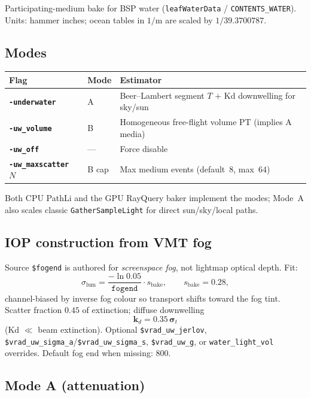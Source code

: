 \documentclass[11pt,a4paper]{article}
\newcommand{\flag}[1]{\texttt{\bfseries #1}}
\newcommand{\vmt}[1]{\texttt{\$#1}}
\newcommand{\ent}[1]{\texttt{#1}}
\newcommand{\code}[1]{\texttt{#1}}
\newcommand{\vect}[1]{\bm{#1}}
\begin{document}
Participating-medium bake for BSP water
(\code{leafWaterData} / \code{CONTENTS\_WATER}). Units: hammer inches;
ocean tables in $1/\mathrm{m}$ are scaled by $1/39.3700787$.

\subsection{Modes}

\begin{center}
\begin{tabular}{@{}lll@{}}
  \toprule
  Flag & Mode & Estimator \\
  \midrule
  \flag{-underwater} & A & Beer--Lambert segment $T$ $+$ Kd downwelling for sky/sun \\
	\flag{-uw\_volume} & B & Homogeneous free-flight volume PT (implies A media) \\
	\flag{-uw\_off} & --- & Force disable \\
	\flag{-uw\_maxscatter}~$N$ & B cap & Max medium events (default~$8$, max~$64$) \\
  \bottomrule
\end{tabular}
\end{center}

Both CPU PathLi and the GPU RayQuery baker implement the modes; Mode~A also
scales classic \code{GatherSampleLight} for direct sun/sky/local paths.

\subsection{IOP construction from VMT fog}

Source \vmt{fogend} is authored for \emph{screenspace fog}, not lightmap
optical depth. Fit:
\begin{equation}
  \sigma_{\mathrm{lum}}
  =
  \frac{-\ln 0.05}{\texttt{fogend}}
  \cdot s_{\mathrm{bake}},
  \qquad
  s_{\mathrm{bake}}=0.28,
\end{equation}
channel-biased by inverse fog colour so transport shifts toward the fog tint.
Scatter fraction $0.45$ of extinction; diffuse downwelling
\begin{equation}
  \vect{k}_d = 0.35\,\vect{\sigma}_t
\end{equation}
(Kd $\ll$ beam extinction). Optional \vmt{vrad\_uw\_jerlov},
\vmt{vrad\_uw\_sigma\_a}/\vmt{vrad\_uw\_sigma\_s}, \vmt{vrad\_uw\_g},
or \ent{water\_light\_vol} overrides. Default fog end when missing: $800$.

\subsection{Mode A (attenuation)}
\end{document}
